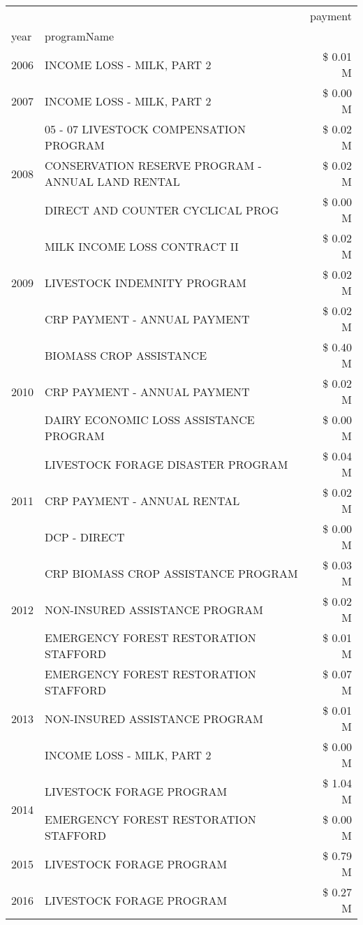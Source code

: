 \begin{tabular}{llr}
\toprule
 &  & payment \\
year & programName &  \\
\midrule
2006 & INCOME LOSS - MILK, PART 2 & \$ 0.01 M \\
\cline{1-3}
2007 & INCOME LOSS - MILK, PART 2 & \$ 0.00 M \\
\cline{1-3}
\multirow[t]{3}{*}{2008} & 05 - 07 LIVESTOCK COMPENSATION PROGRAM & \$ 0.02 M \\
 & CONSERVATION RESERVE PROGRAM - ANNUAL LAND RENTAL & \$ 0.02 M \\
 & DIRECT AND COUNTER CYCLICAL PROG & \$ 0.00 M \\
\cline{1-3}
\multirow[t]{3}{*}{2009} & MILK INCOME LOSS CONTRACT II & \$ 0.02 M \\
 & LIVESTOCK INDEMNITY PROGRAM & \$ 0.02 M \\
 & CRP PAYMENT - ANNUAL PAYMENT & \$ 0.02 M \\
\cline{1-3}
\multirow[t]{3}{*}{2010} & BIOMASS CROP ASSISTANCE & \$ 0.40 M \\
 & CRP PAYMENT - ANNUAL PAYMENT & \$ 0.02 M \\
 & DAIRY ECONOMIC LOSS ASSISTANCE PROGRAM & \$ 0.00 M \\
\cline{1-3}
\multirow[t]{3}{*}{2011} & LIVESTOCK FORAGE DISASTER PROGRAM & \$ 0.04 M \\
 & CRP PAYMENT - ANNUAL RENTAL & \$ 0.02 M \\
 & DCP - DIRECT & \$ 0.00 M \\
\cline{1-3}
\multirow[t]{3}{*}{2012} & CRP BIOMASS CROP ASSISTANCE PROGRAM & \$ 0.03 M \\
 & NON-INSURED ASSISTANCE PROGRAM & \$ 0.02 M \\
 & EMERGENCY FOREST RESTORATION STAFFORD & \$ 0.01 M \\
\cline{1-3}
\multirow[t]{3}{*}{2013} & EMERGENCY FOREST RESTORATION STAFFORD & \$ 0.07 M \\
 & NON-INSURED ASSISTANCE PROGRAM & \$ 0.01 M \\
 & INCOME LOSS - MILK, PART 2 & \$ 0.00 M \\
\cline{1-3}
\multirow[t]{2}{*}{2014} & LIVESTOCK FORAGE PROGRAM & \$ 1.04 M \\
 & EMERGENCY FOREST RESTORATION STAFFORD & \$ 0.00 M \\
\cline{1-3}
2015 & LIVESTOCK FORAGE PROGRAM & \$ 0.79 M \\
\cline{1-3}
\multirow[t]{2}{*}{2016} & LIVESTOCK FORAGE PROGRAM & \$ 0.27 M \\

\end{tabular}
